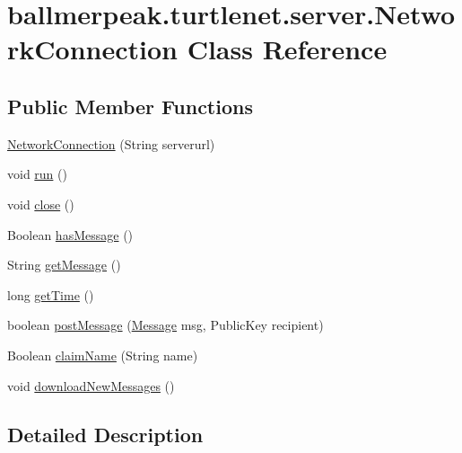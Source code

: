 \hypertarget{classballmerpeak_1_1turtlenet_1_1server_1_1NetworkConnection}{\section{ballmerpeak.\-turtlenet.\-server.\-Network\-Connection Class Reference}
\label{classballmerpeak_1_1turtlenet_1_1server_1_1NetworkConnection}
}
\subsection*{Public Member Functions}
\begin{DoxyCompactItemize}
\item 
\hyperlink{classballmerpeak_1_1turtlenet_1_1server_1_1NetworkConnection_ae7c0317cc0fa85bc885799436affb5e6}{Network\-Connection} (String serverurl)
\item 
void \hyperlink{classballmerpeak_1_1turtlenet_1_1server_1_1NetworkConnection_a44b870f7d418ce3ab69587e94ce32a74}{run} ()
\item 
void \hyperlink{classballmerpeak_1_1turtlenet_1_1server_1_1NetworkConnection_a1bb312cc4af1b95710ecd9b65c5215ce}{close} ()
\item 
Boolean \hyperlink{classballmerpeak_1_1turtlenet_1_1server_1_1NetworkConnection_aadf8e9595cea4dadbb82355e58ba72ec}{has\-Message} ()
\item 
String \hyperlink{classballmerpeak_1_1turtlenet_1_1server_1_1NetworkConnection_a5b9adc8fa4dee623cc1d1c33ccaa7846}{get\-Message} ()
\item 
long \hyperlink{classballmerpeak_1_1turtlenet_1_1server_1_1NetworkConnection_adc4c65f1c818d16a6abd8ace93bf0047}{get\-Time} ()
\item 
boolean \hyperlink{classballmerpeak_1_1turtlenet_1_1server_1_1NetworkConnection_adde42c7caa6295080ba05a66f4bb9ad3}{post\-Message} (\hyperlink{classballmerpeak_1_1turtlenet_1_1shared_1_1Message}{Message} msg, Public\-Key recipient)
\item 
Boolean \hyperlink{classballmerpeak_1_1turtlenet_1_1server_1_1NetworkConnection_a023c16ede7a0c0175e31a937823fbc8f}{claim\-Name} (String name)
\item 
void \hyperlink{classballmerpeak_1_1turtlenet_1_1server_1_1NetworkConnection_aa13cfceaafe089d920b79b877a5b810c}{download\-New\-Messages} ()
\end{DoxyCompactItemize}


\subsection{Detailed Description}


